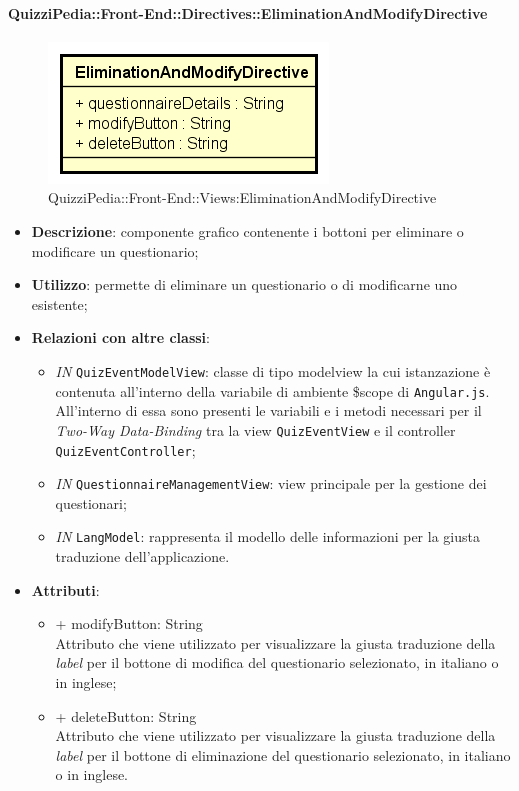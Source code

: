 \paragraph{QuizziPedia::Front-End::Directives::EliminationAndModifyDirective}
\begin{figure} [ht]
	\centering
	\includegraphics[scale=0.45]{UML/Classi/Front-End/QuizziPedia_Front-end_EliminationAndModifyDirective.png}
	\caption{QuizziPedia::Front-End::Views:EliminationAndModifyDirective}
\end{figure} \FloatBarrier
\begin{itemize}
	\item \textbf{Descrizione}: componente grafico contenente i bottoni per eliminare o modificare un questionario;
	\item \textbf{Utilizzo}: permette di eliminare un questionario o di modificarne uno esistente;
	\item \textbf{Relazioni con altre classi}:
	\begin{itemize}
		\item \textit{IN} \texttt{QuizEventModelView}: classe di tipo modelview la cui istanzazione è contenuta all'interno della variabile di ambiente \$scope di \texttt{Angular.js}. All'interno di essa sono presenti le variabili e i metodi necessari per il \textit{Two-Way Data-Binding} tra la view \texttt{QuizEventView} e il controller \texttt{QuizEventController};
		\item \textit{IN} \texttt{QuestionnaireManagementView}: view principale per la gestione dei questionari; 
		\item \textit{IN} \texttt{LangModel}: rappresenta il modello delle informazioni per la giusta traduzione dell'applicazione.
	\end{itemize}
	\item \textbf{Attributi}:
	\begin{itemize}
		\item {+ modifyButton: String} \\ Attributo che viene utilizzato per visualizzare la giusta traduzione della \textit{label} per il bottone di modifica del questionario selezionato, in italiano o in inglese; 
		\item {+ deleteButton: String} \\ Attributo che viene utilizzato per visualizzare la giusta traduzione della \textit{label} per il bottone di eliminazione del questionario selezionato, in italiano o in inglese.
	\end{itemize}
\end{itemize}

